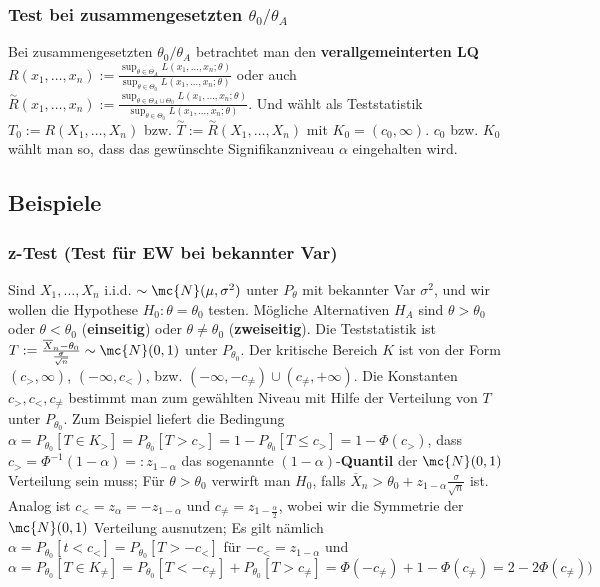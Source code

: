 \subsubsection{Test bei zusammengesetzten $\theta_0/\theta_A$}
Bei zusammengesetzten $\theta_0/\theta_A$ betrachtet man den \textbf{verallgemeinterten LQ} $R(x_1, \dots, x_n) := \frac{\sup_{\theta \in \Theta_A} L(x_1, \dots, x_n; \theta)}{\sup_{\theta \in \Theta_0}L(x_1, \dots, x_n; \theta)}$ oder auch $\overset{\sim}{R}(x_1, \dots, x_n) := \frac{\sup_{\theta \in \Theta_A \cup \Theta_0} L(x_1, \dots, x_n; \theta)}{\sup_{\theta \in \Theta_0}L(x_1, \dots, x_n; \theta)}$. Und wählt als Teststatistik $T_0 := R(X_1, \dots, X_n)$ bzw. $\overset{\sim}{T} := \overset{\sim}{R}(X_1, \dots, X_n)$ mit $K_0 = (c_0, \infty)$. $c_0$ bzw. $K_0$ wählt man so, dass das gewünschte Signifikanzniveau $\alpha$ eingehalten wird.

\subsection{Beispiele}
\subsubsection{z-Test (Test für EW bei bekannter Var)}
Sind $X_1, \dots, X_n$ i.i.d. $\sim \mc{N}(\mu, \sigma^2)$ unter $P_\theta$ mit bekannter Var $\sigma^2$, und wir wollen die Hypothese $H_0: \theta = \theta_0$ testen. Mögliche Alternativen $H_A$ sind $\theta > \theta_0$ oder $\theta < \theta_0$ (\textbf{einseitig}) oder $\theta \neq \theta_0$ (\textbf{zweiseitig}). Die Teststatistik ist $T := \frac{\overline{X}_n - \theta_0}{\frac{\sigma}{\sqrt{n}}} \sim \mc{N}(0, 1)$ unter $P_{\theta_0}$. Der kritische Bereich $K$ ist von der Form $(c_>, \infty)$, $(-\infty, c_<)$, bzw. $(-\infty, -c_{\neq}) \cup (c_{\neq}, + \infty)$. Die Konstanten $c_>, c_<, c_{\neq}$ bestimmt man zum gewählten Niveau mit Hilfe der Verteilung von $T$ unter $P_{\theta_0}$. Zum Beispiel liefert die Bedingung $\alpha = P_{\theta_0}[T \in K_>] = P_{\theta_0}[T > c_>] = 1 - P_{\theta_0}[T \le c_>] = 1 - \Phi(c_>)$, dass $c_> = \Phi^{-1}(1 - \alpha) =: z_{1 - \alpha}$ das sogenannte $(1 - \alpha)$-\textbf{Quantil} der $\mc{N}(0, 1)$ Verteilung sein muss; Für $\theta > \theta_0$ verwirft man $H_0$, falls $\overline{X}_n > \theta_0 + z_{1 - \alpha} \frac{\sigma}{\sqrt{n}}$ ist. Analog ist $c_< = z_\alpha = -z_{1 - \alpha}$ und $c_{\neq} = z_{1 - \frac{\alpha}{2}}$, wobei wir die Symmetrie der $\mc{N}(0, 1)$ Verteilung ausnutzen; Es gilt nämlich $\alpha = P_{\theta_0}[t < c_<] = P_{\theta_0}[T > -c_<]$ für $-c_< = z_{1 - \alpha}$ und $\alpha = P_{\theta_0}[T \in K_{\neq}] = P_{\theta_0} [T < -c_{\neq}] + P_{\theta_0}[T > c_{\neq}] = \Phi(-c_{\neq}) + 1 - \Phi(c_{\neq}) = 2 - 2\Phi(c_{\neq}))$

